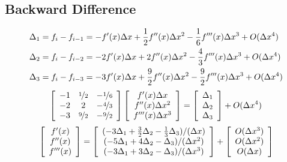 \documentclass[12pt]{article}
\newcommand{\tByt}[9]{
	\left[\begin{array}{c c c}
		#1 & #2 & #3 \\
		#4 & #5 & #6 \\
		#7 & #8 & #9 \\
		\end{array}\right]
}
\newcommand{\tvec}[3]
{	
	\left[
	\begin{array}{c}
		#1 \\ #2 \\ #3
	\end{array}
	\right]
}
\newcommand{\dx}{\Delta x}
\begin{document}
\subsection{Backward Difference}
\begin{align*}
\del_1 &= f_{i}-f_{i-1} = -f'(x)\dx + \frac{1}{2}f''(x)\dx^2-\frac{1}{6}f'''(x)\dx^3+O(\dx^4)\\
\del_2 &= f_{i}-f_{i-2} = -2f'(x)\dx + 2f''(x)\dx^2-\frac{4}{3}f'''(x)\dx^3+O(\dx^4) \\
\del_3 &= f_{i}-f_{i-3} = -3f'(x)\dx + \frac{9}{2}f''(x)\dx^2-\frac{9}{2}f'''(x)\dx^3+O(\dx^4)
\end{align*}
\begin{equation*}
\tByt{-1}{\nicefrac{1}{2}}{-\nicefrac{1}{6}}{-2}{2}{-\nicefrac{4}{3}}{-3}{\nicefrac{9}{2}}{-\nicefrac{9}{2}}\tvec{f'(x)\dx}{f''(x)\dx^2}{f'''(x)\dx^3} = \tvec{\del_1}{\del_2}{\del_3} + O(\dx^4)
\end{equation*}
\begin{equation*}
\tvec{f'(x)}{f''(x)}{f'''(x)}= \tvec{(-3\del_1+\frac{3}{2}\del_2-\frac{1}{3}\del_3)/(\dx)}{(-5\del_1+4\del_2-\del_3)/(\dx^2)}{(-3\del_1+3\del_2-\del_3)/(\dx^3)}+\tvec{O(\dx^3)}{O(\dx^2)}{O(\dx)}
\end{equation*}
\end{document}
